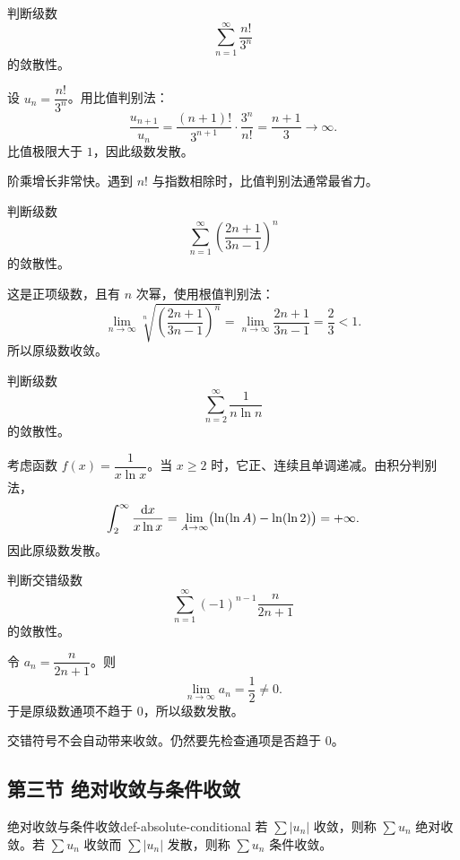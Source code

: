 \begin{problem}
判断级数
\[
  \sum_{n=1}^{\infty}\frac{n!}{3^n}
\]
的敛散性。
\end{problem}
\begin{solution}
设 $u_n=\dfrac{n!}{3^n}$。用比值判别法：
\[
  \frac{u_{n+1}}{u_n}
  =\frac{(n+1)!}{3^{n+1}}\cdot\frac{3^n}{n!}
  =\frac{n+1}{3}\to\infty.
\]
比值极限大于 $1$，因此级数发散。
\end{solution}
\begin{note}
阶乘增长非常快。遇到 $n!$ 与指数相除时，比值判别法通常最省力。
\end{note}

\begin{problem}
判断级数
\[
  \sum_{n=1}^{\infty}\left(\frac{2n+1}{3n-1}\right)^n
\]
的敛散性。
\end{problem}
\begin{solution}
这是正项级数，且有 $n$ 次幂，使用根值判别法：
\[
  \lim_{n\to\infty}\sqrt[n]{\left(\frac{2n+1}{3n-1}\right)^n}
  =\lim_{n\to\infty}\frac{2n+1}{3n-1}=\frac23<1.
\]
所以原级数收敛。
\end{solution}

\begin{problem}
判断级数
\[
  \sum_{n=2}^{\infty}\frac1{n\ln n}
\]
的敛散性。
\end{problem}
\begin{solution}
考虑函数 $f(x)=\dfrac1{x\ln x}$。当 $x\ge2$ 时，它正、连续且单调递减。由积分判别法，
\[
  \int_2^\infty\frac{\mathop{}\!\mathrm{d} x}{x\ln x}
  =\lim_{A\to\infty}\bigl(\ln(\ln A)-\ln(\ln2)\bigr)=+\infty.
\]
因此原级数发散。
\end{solution}

\begin{problem}
判断交错级数
\[
  \sum_{n=1}^{\infty}(-1)^{n-1}\frac{n}{2n+1}
\]
的敛散性。
\end{problem}
\begin{solution}
令 $a_n=\dfrac{n}{2n+1}$。则
\[
  \lim_{n\to\infty}a_n=\frac12\ne0.
\]
于是原级数通项不趋于 $0$，所以级数发散。
\end{solution}
\begin{note}
交错符号不会自动带来收敛。仍然要先检查通项是否趋于 $0$。
\end{note}

\subsection{第三节 绝对收敛与条件收敛}

\begin{dy}{绝对收敛与条件收敛}{def-absolute-conditional}
若 $\sum |u_n|$ 收敛，则称 $\sum u_n$ 绝对收敛。若 $\sum u_n$ 收敛而 $\sum |u_n|$ 发散，则称 $\sum u_n$ 条件收敛。
\end{dy}

